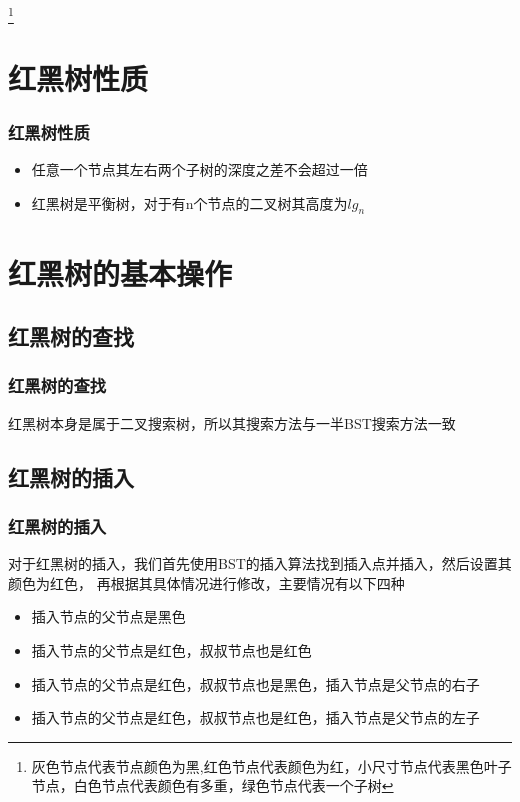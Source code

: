 \documentclass{beamer}
\begin{document}
\begin{CJK}{UTF8}{gbsn}
\begin{frame}
\begin{columns}
		\end{columns}

		\footnote{灰色节点代表节点颜色为黑,红色节点代表颜色为红，小尺寸节点代表黑色叶子节点，白色节点代表颜色有多重，绿色节点代表一个子树}
	\end{frame}

	\section{红黑树性质}
    \begin{frame}
        \frametitle{红黑树性质}\pause
        \begin{itemize}
         \item[1] 任意一个节点其左右两个子树的深度之差不会超过一倍 \pause
		 \item[2] 红黑树是平衡树，对于有n个节点的二叉树其高度为$lg_n$
        \end{itemize}
    \end{frame}

	\section{红黑树的基本操作}

	\subsection{红黑树的查找}
    \begin{frame}
		\frametitle{红黑树的查找}
		红黑树本身是属于二叉搜索树，所以其搜索方法与一半BST搜索方法一致
    \end{frame}

	\subsection{红黑树的插入}
    \begin{frame}
		\frametitle{红黑树的插入}
		对于红黑树的插入，我们首先使用BST的插入算法找到插入点并插入，然后设置其颜色为红色，
	再根据其具体情况进行修改，主要情况有以下四种
		\begin{itemize}
			\item[1] 插入节点的父节点是黑色
			\item[2] 插入节点的父节点是红色，叔叔节点也是红色
			\item[3] 插入节点的父节点是红色，叔叔节点也是黑色，插入节点是父节点的右子
			\item[4] 插入节点的父节点是红色，叔叔节点也是红色，插入节点是父节点的左子
		\end{itemize}
    \end{frame}


\end{CJK}
\end{document}
